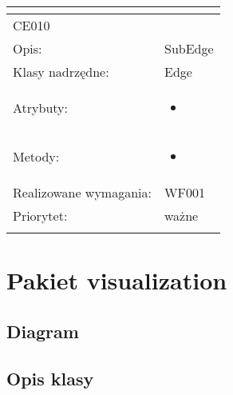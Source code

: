 \documentclass[a4paper,10pt]{article}
\begin{document}
\begin{center}
\begin{longtable}{|m{3cm}|m{9cm}|}
\multicolumn{2}{c}{} \\
 \hline

CE010 &  \\ \hline
Opis: & SubEdge    \\ \hline
Klasy nadrzędne: & Edge    \\ \hline
Atrybuty: & \begin{itemize}
 \item 
\end{itemize}
 \\ \hline
Metody: & \begin{itemize}
 \item 
\end{itemize}
  \\ \hline
Realizowane wymagania: & WF001 \\ \hline
Priorytet: & ważne  \\ \hline

\multicolumn{2}{c}{} \\
 \hline


\end{longtable}

\end{center}

\section{Pakiet visualization }

\subsection{Diagram}

\subsection{Opis klasy}
\end{document}
